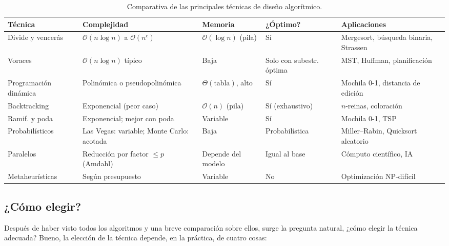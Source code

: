 \documentclass[12pt,letterpaper]{article}
\begin{document}
\begin{table}[ht]
\centering
\scriptsize
\renewcommand{\arraystretch}{1.2}
\caption{Comparativa de las principales técnicas de diseño algorítmico.}
\label{tab:comparativa}
\begin{tabular}{|p{2.2cm}|p{3.2cm}|p{2.3cm}|p{2.2cm}|p{4cm}|}
\hline
\textbf{Técnica} & \textbf{Complejidad} & \textbf{Memoria} & \textbf{¿Óptimo?} & \textbf{Aplicaciones} \\
\hline
Divide y vencerás       & $\mathcal{O}(n\log n)$ a $\mathcal{O}(n^c)$ & $\mathcal{O}(\log n)$ (pila)   & Sí                & Mergesort, búsqueda binaria, Strassen \\
\hline
Voraces                 & $\mathcal{O}(n\log n)$ típico               & Baja                            & Solo con subestr. óptima & MST, Huffman, planificación \\
\hline
Programación dinámica   & Polinómica o pseudopolinómica               & $\Theta(\text{tabla})$, alto    & Sí                & Mochila 0-1, distancia de edición \\
\hline
Backtracking            & Exponencial (peor caso)                     & $\mathcal{O}(n)$ (pila)        & Sí (exhaustivo)   & $n$-reinas, coloración \\
\hline
Ramif. y poda           & Exponencial; mejor con poda                 & Variable                        & Sí                & Mochila 0-1, TSP \\
\hline
Probabilísticos         & Las Vegas: variable; Monte Carlo: acotada   & Baja                            & Probabilística    & Miller--Rabin, Quicksort aleatorio \\
\hline
Paralelos               & Reducción por factor $\leq p$ (Amdahl)      & Depende del modelo              & Igual al base     & Cómputo científico, IA \\
\hline
Metaheurísticas         & Según presupuesto                           & Variable                        & No                & Optimización \textsf{NP}-difícil \\
\hline
\end{tabular}
\end{table}

\subsection{¿Cómo elegir?}
Después de haber visto todos los algoritmos y una breve comparación sobre 
ellos, surge la pregunta natural, ¿cómo elegir la técnica adecuada? 
Bueno, la elección de la técnica depende, en la práctica, de cuatro cosas:
\end{document}
